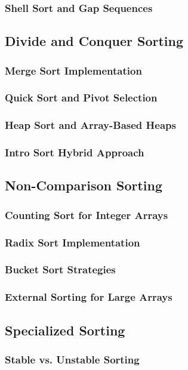 \documentclass[12pt, oneside]{book}
\begin{document}
\subsubsection{Shell Sort and Gap Sequences}

\subsection{Divide and Conquer Sorting}
\subsubsection{Merge Sort Implementation}
\subsubsection{Quick Sort and Pivot Selection}
\subsubsection{Heap Sort and Array-Based Heaps}
\subsubsection{Intro Sort Hybrid Approach}

\subsection{Non-Comparison Sorting}
\subsubsection{Counting Sort for Integer Arrays}
\subsubsection{Radix Sort Implementation}
\subsubsection{Bucket Sort Strategies}
\subsubsection{External Sorting for Large Arrays}

\subsection{Specialized Sorting}
\subsubsection{Stable vs. Unstable Sorting}
\end{document}
